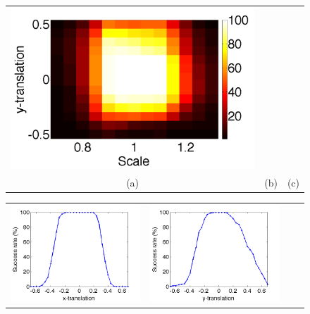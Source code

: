 \begin{figure}
{\begin{tabular}{ccc}
\includegraphics[height=\tempheighta]{figures_pami/y_s_roa.png}\\
(a)&(b)&(c)
\end{tabular}
\begin{tabular}{cccc}
\includegraphics[height=\tempheightb]{figures_pami/x_tr.png} &
\includegraphics[height=\tempheightb]{figures_pami/y_tr.png} &

\end{tabular}}
\end{figure}

